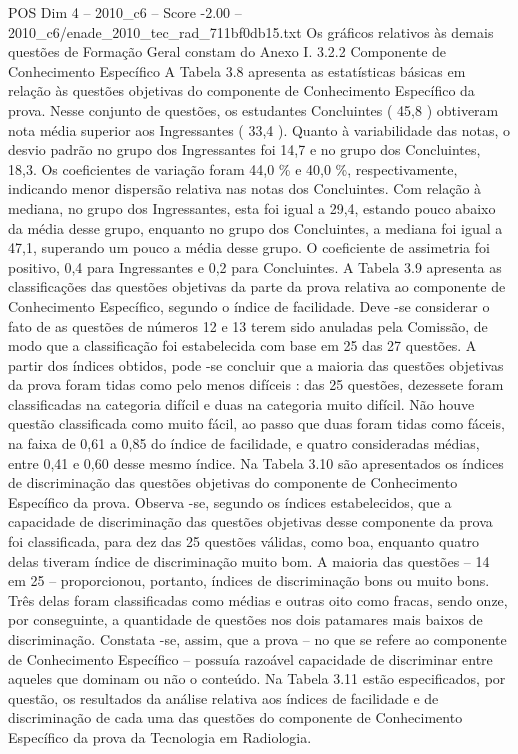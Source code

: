 \begin{textsample}{POS Dim 4 – 2010\_c6 – Score -2.00 – 2010\_c6/enade\_2010\_tec\_rad\_711bf0db15.txt}
Os gráficos relativos às demais questões de Formação Geral constam do Anexo I. 3.2.2 Componente de Conhecimento Específico A Tabela 3.8 apresenta as estatísticas básicas em relação às questões objetivas do componente de Conhecimento Específico da prova.
Nesse conjunto de questões, os estudantes Concluintes ( 45,8 ) obtiveram nota média superior aos Ingressantes ( 33,4 ).
Quanto à variabilidade das notas, o desvio padrão no grupo dos Ingressantes foi 14,7 e no grupo dos Concluintes, 18,3.
Os coeficientes de variação foram 44,0 \% e 40,0 \%, respectivamente, indicando menor dispersão relativa nas notas dos Concluintes.
Com relação à mediana, no grupo dos Ingressantes, esta foi igual a 29,4, estando pouco abaixo da média desse grupo, enquanto no grupo dos Concluintes, a mediana foi igual a 47,1, superando um pouco a média desse grupo.
O coeficiente de assimetria foi positivo, 0,4 para Ingressantes e 0,2 para Concluintes.
A Tabela 3.9 apresenta as classificações das questões objetivas da parte da prova relativa ao componente de Conhecimento Específico, segundo o índice de facilidade.
Deve -se considerar o fato de as questões de números 12 e 13 terem sido anuladas pela Comissão, de modo que a classificação foi estabelecida com base em 25 das 27 questões.
A partir dos índices obtidos, pode -se concluir que a maioria das questões objetivas da prova foram tidas como pelo menos difíceis : das 25 questões, dezessete foram classificadas na categoria difícil e duas na categoria muito difícil.
Não houve questão classificada como muito fácil, ao passo que duas foram tidas como fáceis, na faixa de 0,61 a 0,85 do índice de facilidade, e quatro consideradas médias, entre 0,41 e 0,60 desse mesmo índice.
Na Tabela 3.10 são apresentados os índices de discriminação das questões objetivas do componente de Conhecimento Específico da prova.
Observa -se, segundo os índices estabelecidos, que a capacidade de discriminação das questões objetivas desse componente da prova foi classificada, para dez das 25 questões válidas, como boa, enquanto quatro delas tiveram índice de discriminação muito bom.
A maioria das questões – 14 em 25 – proporcionou, portanto, índices de discriminação bons ou muito bons.
Três delas foram classificadas como médias e outras oito como fracas, sendo onze, por conseguinte, a quantidade de questões nos dois patamares mais baixos de discriminação.
Constata -se, assim, que a prova – no que se refere ao componente de Conhecimento Específico – possuía razoável capacidade de discriminar entre aqueles que dominam ou não o conteúdo.
Na Tabela 3.11 estão especificados, por questão, os resultados da análise relativa aos índices de facilidade e de discriminação de cada uma das questões do componente de Conhecimento Específico da prova da Tecnologia em Radiologia.

\end{textsample}
